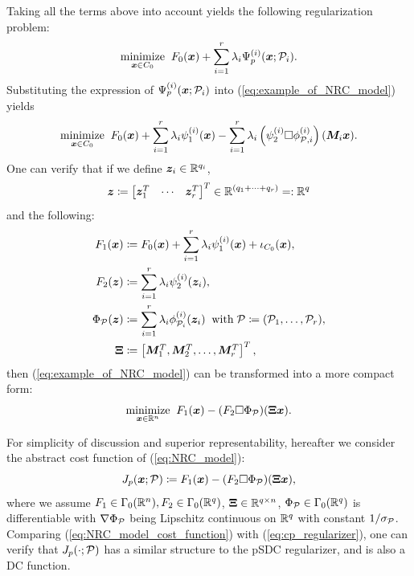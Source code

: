 \documentclass[lettersize,journal]{IEEEtran}
\theoremstyle{plain}%
\theoremstyle{definition}
\theoremstyle{remark}
\begin{document}
Taking all the terms above into account yields the following regularization problem:
\begin{equation}\label{eq:example_of_NRC_model}
\underset{\bm{x}\in C_0}{\text{minimize}}\;\;F_0(\bm{x})+\sum_{i=1}^r\lambda_{i}\Psi_{p}^{(i)}(\bm{x};\mathcal{P}_i).
\end{equation}
Substituting the expression of $\Psi_{p}^{(i)}(\bm{x};\mathcal{P}_i)$ into (\ref{eq:example_of_NRC_model}) yields
\begin{align*}
\underset{\bm{x}\in C_0}{\text{minimize}}\;\;F_0(\bm{x})+\sum_{i=1}^r\lambda_{i} \psi_{1}^{(i)}(\bm{x})-\sum_{i=1}^r\lambda_{i} \left( \psi_{2}^{(i)}\Box \phi^{(i)}_{\mathcal{P},i} \right )(\bm{M}_i\bm{x}).
\end{align*}
One can verify that if we define $\bm{z}_i\in\mathbb{R}^{q_i}$,
\[\bm{z}\coloneqq \begin{bmatrix}\bm{z}_1^T & \cdots & \bm{z}_r^T\end{bmatrix}^T\in\mathbb{R}^{(q_1+\dots+q_r)}=:\mathbb{R}^q\]
and the following:
\begin{align}
F_1(\bm{x}) &\coloneqq F_0(\bm{x})+\sum_{i=1}^r\lambda_{i} \psi_{1}^{(i)}(\bm{x})+\iota_{C_0}(\bm{x}),\label{eq:unification_begin}\\
F_2(\bm{z}) &\coloneqq \sum_{i=1}^r\lambda_{i} \psi_{2}^{(i)}(\bm{z}_i),\\
\Phi_{\mathcal{P}}(\bm{z}) &\coloneqq \sum_{i=1}^r\lambda_{i} \phi^{(i)}_{\mathcal{P}_i}(\bm{z}_i)\;\;\textrm{with}\; \mathcal{P}\coloneqq (\mathcal{P}_1,\dots,\mathcal{P}_r),\\
\bm{\Xi} &\coloneqq \begin{bmatrix}
\bm{M}_1^T, \bm{M}_2^T,\dots, \bm{M}_r^T
\end{bmatrix}^T,\label{eq:unification_end}
\end{align}
then (\ref{eq:example_of_NRC_model}) can be transformed into a more compact form:
\begin{equation}\label{eq:NRC_model}
\underset{\bm{x}\in\mathbb{R}^n}{\mathrm{minimize}}\;\; F_1(\bm{x})-(F_2\Box\Phi_{\mathcal{P}})(\bm{\Xi}\bm{x}).
\end{equation}

For simplicity of discussion and superior representability, hereafter we consider the abstract cost function of (\ref{eq:NRC_model}):
\begin{equation}\label{eq:NRC_model_cost_function}
J_{p}(\bm{x};\mathcal{P})\coloneqq F_1(\bm{x})-(F_2\Box\Phi_{\mathcal{P}})(\bm{\Xi} \bm{x}),
\end{equation}
where we assume $F_1\in\Gamma_0(\mathbb{R}^n),F_2\in\Gamma_0(\mathbb{R}^q)$, $\bm{\Xi}\in\mathbb{R}^{q\times n}$, $\Phi_{\mathcal{P}}\in\Gamma_0(\mathbb{R}^q)$ is differentiable with $\nabla \Phi_{\mathcal{P}}$ being Lipschitz continuous on $\mathbb{R}^q$ with constant $1/\sigma_{\mathcal{P}}$. Comparing (\ref{eq:NRC_model_cost_function}) with (\ref{eq:cp_regularizer}), one can verify that $J_{p}(\cdot;\mathcal{P})$ has a similar structure to the pSDC regularizer, and is also a DC function.
\end{document}
